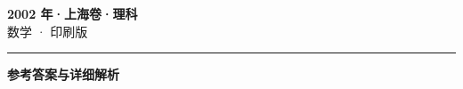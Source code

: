 \documentclass[zihao=5, a4paper]{ctexart}
\begin{document}
\begin{center}
  {\Large\bfseries 2002 年·上海卷·理科}\\[4pt]
  {\large 数学 · 印刷版}
\end{center}
\medskip
{}

\par\bigskip\hrule\bigskip
{}
\begin{center}{\large\bfseries 参考答案与详细解析}\end{center}
\smallskip

\end{document}
